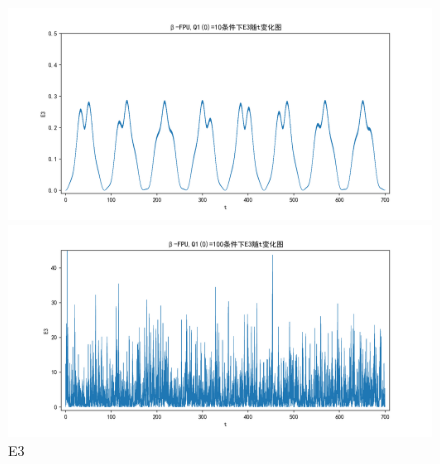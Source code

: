 \documentclass[10pt, a4paper]{article}
\begin{document}
    \begin{figure}[H]
        \begin{minipage}[t]{0.49\textwidth}
            \centering
            \includegraphics[width=\textwidth]{./q6_pics/cmp/E3.png}
        \end{minipage}
        \begin{minipage}[t]{0.49\textwidth}
            \centering
            \includegraphics[width=\textwidth]{./q6_pics/exp/E3.png}
        \end{minipage}
        \caption{E3}\label{fig:E3 in q6}
    \end{figure}
\end{document}
